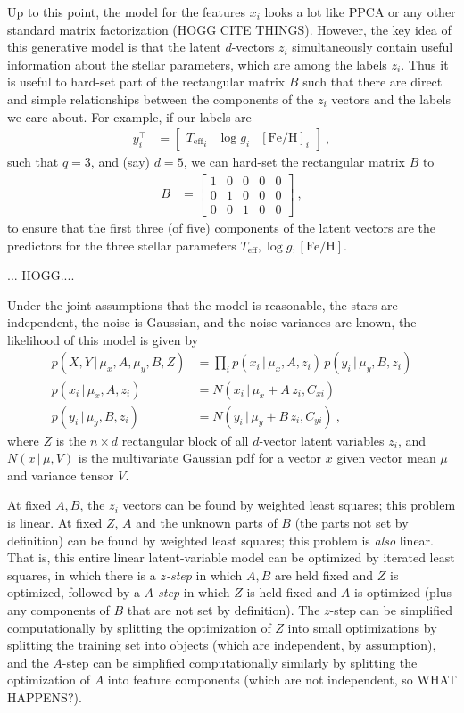 \documentclass[modern]{aastex631}
\newcommand{\given}{\,|\,}
\newcommand{\teff}{{T_{\mathrm{eff}}}}
\newcommand{\logg}{\log g}
\newcommand{\feh}{[\mathrm{Fe}/\mathrm{H}]}
\begin{document}
Up to this point, the model for the features $x_i$ looks a lot like PPCA or any other standard matrix factorization (HOGG CITE THINGS).
However, the key idea of this generative model is that the latent $d$-vectors $z_i$ simultaneously contain useful information about the stellar parameters, which are among the labels $z_i$.
Thus it is useful to hard-set part of the rectangular matrix $B$ such that there are direct and simple relationships between the components of the $z_i$ vectors and the labels we care about.
For example, if our labels are
\begin{align}
  y_i^\top &= \begin{bmatrix}\teff_i & \logg_i & \feh_i\end{bmatrix} ~,
\end{align}
such that $q=3$, and (say) $d=5$, we can hard-set the rectangular matrix $B$ to
\begin{align}
  B &= \begin{bmatrix}
    1 & 0 & 0 & 0 & 0 \\
    0 & 1 & 0 & 0 & 0 \\
    0 & 0 & 1 & 0 & 0
    \end{bmatrix} ~,
\end{align}
to ensure that the first three (of five) components of the latent vectors are the predictors for the three stellar parameters $\teff, \logg, \feh$.

  ... HOGG....

Under the joint assumptions that the model is reasonable, the stars are independent, the noise is Gaussian, and the noise variances are known, the likelihood of this model is given by
\begin{align}
  p(X, Y\given \mu_x, A, \mu_y, B, Z) &= \prod_i p(x_i\given \mu_x, A, z_i)\,p(y_i\given \mu_y, B, z_i) \\
  p(x_i\given \mu_x, A, z_i) &= N(x_i\given \mu_x + A\,z_i, C_{xi}) \\
  p(y_i\given \mu_y, B, z_i) &= N(y_i\given \mu_y + B\,z_i, C_{yi}) ~,
\end{align}
where $Z$ is the $n\times d$ rectangular block of all $d$-vector latent variables $z_i$,
and $N(x\given\mu,V)$ is the multivariate Gaussian pdf for a vector $x$ given vector mean $\mu$ and variance tensor $V$.

At fixed $A, B$, the $z_i$ vectors can be found by weighted least squares; this problem is linear.
At fixed $Z$, $A$ and the unknown parts of $B$ (the parts not set by definition) can be found by weighted least squares; this problem is \emph{also} linear.
That is, this entire linear latent-variable model can be optimized by iterated least squares, in which there is a \emph{$z$-step} in which $A, B$ are held fixed and $Z$ is optimized, followed by a \emph{$A$-step} in which $Z$ is held fixed and $A$ is optimized (plus any components of $B$ that are not set by definition).
The $z$-step can be simplified computationally by splitting the optimization of $Z$ into small optimizations by splitting the training set into objects (which are independent, by assumption), and the $A$-step can be simplified computationally similarly by splitting the optimization of $A$ into feature components (which are not independent, so WHAT HAPPENS?).
\end{document}
